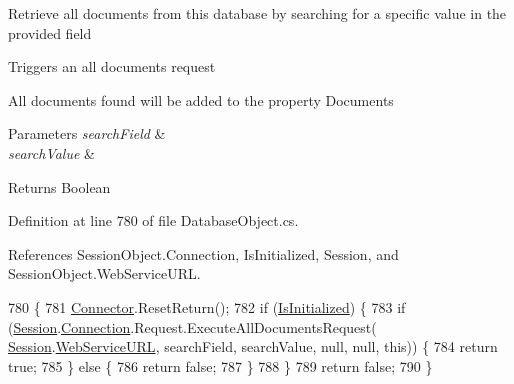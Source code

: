 Retrieve all documents from this database by searching for a specific value in the provided field 

Triggers an all documents request

All documents found will be added to the property \textquotesingle{}Documents\textquotesingle{}


\begin{DoxyParams}{Parameters}
{\em search\+Field} & \\
\hline
{\em search\+Value} & \\
\hline
\end{DoxyParams}
\begin{DoxyReturn}{Returns}
Boolean
\end{DoxyReturn}


Definition at line 780 of file Database\+Object.\+cs.



References Session\+Object.\+Connection, Is\+Initialized, Session, and Session\+Object.\+Web\+Service\+U\+RL.


\begin{DoxyCode}
780                                                                              \{
781         \mbox{\hyperlink{class_connector}{Connector}}.ResetReturn();
782         \textcolor{keywordflow}{if} (\mbox{\hyperlink{class_database_object_a5fe036d32a30eb10d1b3f6a30263f740}{IsInitialized}}) \{
783             \textcolor{keywordflow}{if} (\mbox{\hyperlink{class_database_object_aa8484162b7d2a7c4c9426bca13c64c07}{Session}}.\mbox{\hyperlink{class_session_object_a014bdbf705a753540e19bfb53030c55c}{Connection}}.Request.ExecuteAllDocumentsRequest(
      \mbox{\hyperlink{class_database_object_aa8484162b7d2a7c4c9426bca13c64c07}{Session}}.\mbox{\hyperlink{class_session_object_a697c071c812fbf7ad1166b896fb44c16}{WebServiceURL}}, searchField, searchValue, null, null, \textcolor{keyword}{this})) \{
784                 \textcolor{keywordflow}{return} \textcolor{keyword}{true};
785             \} \textcolor{keywordflow}{else} \{
786                 \textcolor{keywordflow}{return} \textcolor{keyword}{false};
787             \}
788         \}
789         \textcolor{keywordflow}{return} \textcolor{keyword}{false};
790     \}
\end{DoxyCode}
\mbox{\label{class_database_object_a4d8a7d73614f53a04fe8eb79bef2f614}} 
